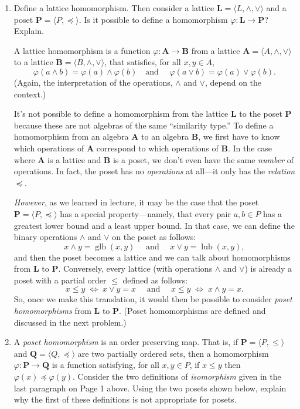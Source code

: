 \documentclass[12pt,reqno]{amsart}
\newcommand{\bL}{\ensuremath{\mathbf{L}}}
\newcommand{\bP}{\ensuremath{\mathbf{P}}}
\newcommand{\bQ}{\ensuremath{\mathbf{Q}}}
\newcommand{\bA}{\ensuremath{\mathbf{A}}}
\newcommand{\bB}{\ensuremath{\mathbf{B}}}
\newcommand{\meet}{\ensuremath{\wedge}}
\newcommand{\<}{\ensuremath{\langle}}
\renewcommand{\>}{\ensuremath{\rangle}}
\newcommand{\join}{\ensuremath{\vee}}
\newcommand{\glb}{\operatorname{glb}}
\newcommand{\lub}{\operatorname{lub}}
\begin{document}
\begin{enumerate}[{\bf 1.}]
\bigskip

\item
Define a lattice homomorphism.
Then consider a lattice $\bL = \<L, \meet, \join\>$ and a poset $\bP = \<P, \preccurlyeq\>$.
Is it possible to define a homomorphism $\varphi: \bL \rightarrow \bP$?  Explain.

\medskip
{} 
A lattice  homomorphism is a function 
$\varphi: \bA \rightarrow  \bB$
from a lattice $\bA = \<A, \meet, \join\>$ to a
lattice $\bB = \<B, \meet, \join\>$,
that satisfies, for all $x, y \in A$, 
\[
\varphi(a\meet b)
=\varphi(a)\meet \varphi(b) 
\quad \text{
and }
\quad
\varphi(a\join b)
=\varphi(a) \join \varphi(b).
\]
(Again, the interpretation of the operations, $\meet$ and $\join$, depend on the
context.)

\medskip
It's not possible to define a homomorphism from the lattice $\bL$ to the poset
$\bP$ because these are not algebras of the same ``similarity type.''  To define
a homomorphism from an algebra $\bA$ to an algebra $\bB$, we first have to know
which operations of $\bA$ correspond to which operations of $\bB$.  
In the case where $\bA$ is a lattice and $\bB$ is a poset, we don't even have
the same \emph{number} of operations. In fact, the poset has no \emph{operations} at
all---it only has the \emph{relation} $\preccurlyeq$.

\emph{However}, as we learned in lecture, it may be the case that the poset
$\bP = \<P, \preccurlyeq\>$ has a special property---namely, that every pair 
$a, b \in P$ has a greatest lower bound and a least upper bound.  In that case,
we can define the binary operations $\meet$ and $\join$ on the poset as follows:
\[
x\meet y = \glb(x,y) \quad \text{ and } \quad x \join y = \lub(x,y),
\]
and then the poset becomes a lattice and we can talk about homomorphisms from
$\bL$ to $\bP$.
Conversely, every lattice (with operations $\meet$ and $\join$) is already a poset with
a partial order $\leq$ defined as follows:
\[
 x\leq y  \; \Longleftrightarrow \;  x\join y = x 
\quad \text{ and } \quad
x\leq y \; \Longleftrightarrow \;  x\meet y = x. 
\]
So, once we make this translation, it would then be possible to consider
\emph{poset homomorphisms} from $\bL$ to $\bP$.  (Poset
homomorphisms are defined and discussed in the next problem.)

\bigskip
\item
A \emph{poset homomorphism} is an order preserving map.  That is, if
$\bP = \<P, \leqslant\>$ and 
$\bQ = \<Q, \preccurlyeq\>$ are two partially 
ordered sets, then a homomorphism 
$\varphi: \bP \rightarrow \bQ$  is a function satisfying, for all $x, y\in P$, 
if $x \leqslant y$ then $\varphi(x)\preccurlyeq \varphi(y)$.
Consider the two definitions of \emph{isomorphism} given in the last paragraph
on Page 1 above.
Using the two posets shown below, explain why the first of these definitions is 
not appropriate for posets.


\end{enumerate}
\end{document}

